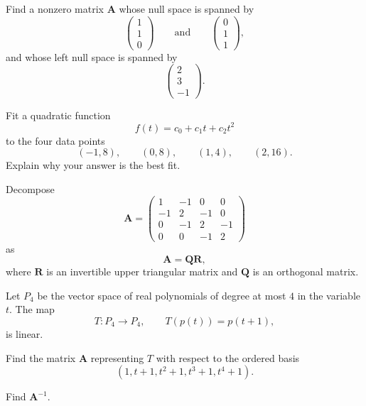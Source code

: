 \begin{problem}
Find a nonzero matrix $\mathbf A$ whose null space is spanned by
\[
\begin{pmatrix}
1\\1\\0
\end{pmatrix}
\qquad\text{and}\qquad
\begin{pmatrix}
0\\1\\1
\end{pmatrix},
\]
and whose left null space is spanned by
\[
\begin{pmatrix}
2\\3\\-1
\end{pmatrix}.
\]
\end{problem}

\begin{problem}
Fit a quadratic function
\[
f(t)=c_0+c_1t+c_2t^2
\]
to the four data points
\[
(-1,8),\qquad(0,8),\qquad(1,4),\qquad(2,16).
\]
Explain why your answer is the best fit.
\end{problem}

\begin{problem}
Decompose
\[
\mathbf A=
\begin{pmatrix}
1&-1&0&0\\
-1&2&-1&0\\
0&-1&2&-1\\
0&0&-1&2
\end{pmatrix}
\]
as
\[
\mathbf A=\mathbf Q\mathbf R,
\]
where $\mathbf R$ is an invertible upper triangular matrix and $\mathbf Q$ is an orthogonal matrix.
\end{problem}

\begin{problem}
Let $P_4$ be the vector space of real polynomials of degree at most $4$ in the variable $t$. The map
\[
T\colon P_4\to P_4,
\qquad
T(p(t))=p(t+1),
\]
is linear.
\begin{problemsubparts}
\item Find the matrix $\mathbf A$ representing $T$ with respect to the ordered basis
\[
(1,t+1,t^2+1,t^3+1,t^4+1).
\]
\item Find $\mathbf A^{-1}$.
\end{problemsubparts}
\end{problem}

